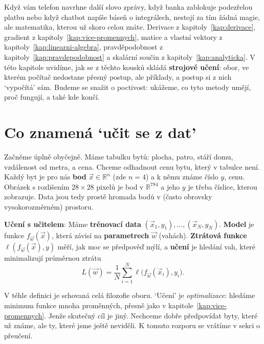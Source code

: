 \label{kap:ml}

Když vám telefon navrhne další slovo zprávy, když banka zablokuje podezřelou platbu nebo když chatbot napíše báseň o integrálech, nestojí za tím žádná magie, ale matematika, kterou už skoro celou znáte. Derivace z kapitoly~\ref{kap:derivace}, gradient z kapitoly~\ref{kap:vice-promennych}, matice a vlastní vektory z kapitoly~\ref{kap:linearni-algebra}, pravděpodobnost z kapitoly~\ref{kap:pravdepodobnost} a skalární součin z kapitoly~\ref{kap:analyticka}. V této kapitole uvidíme, jak se z těchto kousků skládá \textbf{strojové učení}: obor, ve kterém počítač nedostane přesný postup, ale příklady, a postup si z nich `vypočítá' sám. Budeme se snažit o poctivost: ukážeme, co tyto metody umějí, proč fungují, a také kde končí.

\section{Co znamená `učit se z dat'}

Začněme úplně obyčejně. Máme tabulku bytů: plocha, patro, stáří domu, vzdálenost od metra, a cena. Chceme odhadnout cenu bytu, který v tabulce není. Každý byt je pro nás \textbf{bod} $\vec{x}\in\mathbb{R}^n$ (zde $n = 4$) a k němu známe číslo $y$, cenu. Obrázek s rozlišením $28\times 28$ pixelů je bod v $\mathbb{R}^{784}$ a jeho $y$ je třeba číslice, kterou zobrazuje. Data jsou tedy prostě hromada bodů v (často obrovsky vysokorozměrném) prostoru.

\begin{definitionbox}
  \textbf{Učení s učitelem}: Máme \textbf{trénovací data} $(\vec{x}_1, y_1), \dots, (\vec{x}_N, y_N)$. \textbf{Model} je funkce $f_{\vec{w}}(\vec{x})$, která závisí na \textbf{parametrech} $\vec{w}$ (vahách). \textbf{Ztrátová funkce} $\ell(f_{\vec{w}}(\vec{x}), y)$ měří, jak moc se předpověď mýlí, a \textbf{učení} je hledání vah, které minimalizují průměrnou ztrátu
  \begin{equation*}
    L(\vec{w}) = \frac{1}{N}\sum_{i=1}^{N}\ell\big(f_{\vec{w}}(\vec{x}_i), y_i\big).
  \end{equation*}
\end{definitionbox}

V téhle definici je schovaná celá filozofie oboru. `Učení' je \textit{optimalizace}: hledáme minimum funkce mnoha proměnných, přesně jako v kapitole~\ref{kap:vice-promennych}. Jenže skutečný cíl je jiný. Nechceme dobře předpovídat byty, které už známe, ale ty, které jsme ještě neviděli. K tomuto rozporu se vrátíme v sekci o přeučení.

